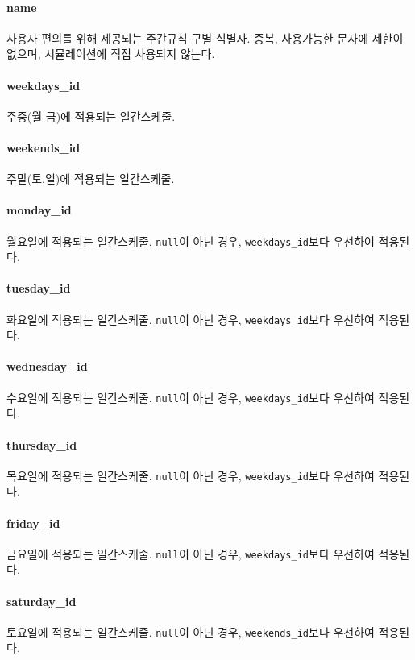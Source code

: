 \paragraph{name} 사용자 편의를 위해 제공되는 주간규칙 구별 식별자. 중복, 사용가능한 문자에 제한이 없으며, 시뮬레이션에 직접 사용되지 않는다.

\paragraph{weekdays\_id} 주중(월-금)에 적용되는 일간스케줄.

\paragraph{weekends\_id} 주말(토,일)에 적용되는 일간스케줄.

\paragraph{monday\_id} 월요일에 적용되는 일간스케줄. \texttt{null}이 아닌 경우, \texttt{weekdays\_id}보다 우선하여 적용된다.

\paragraph{tuesday\_id} 화요일에 적용되는 일간스케줄. \texttt{null}이 아닌 경우, \texttt{weekdays\_id}보다 우선하여 적용된다.

\paragraph{wednesday\_id} 수요일에 적용되는 일간스케줄. \texttt{null}이 아닌 경우, \texttt{weekdays\_id}보다 우선하여 적용된다.

\paragraph{thursday\_id} 목요일에 적용되는 일간스케줄. \texttt{null}이 아닌 경우, \texttt{weekdays\_id}보다 우선하여 적용된다.

\paragraph{friday\_id} 금요일에 적용되는 일간스케줄. \texttt{null}이 아닌 경우, \texttt{weekdays\_id}보다 우선하여 적용된다.

\paragraph{saturday\_id} 토요일에 적용되는 일간스케줄. \texttt{null}이 아닌 경우, \texttt{weekends\_id}보다 우선하여 적용된다.

